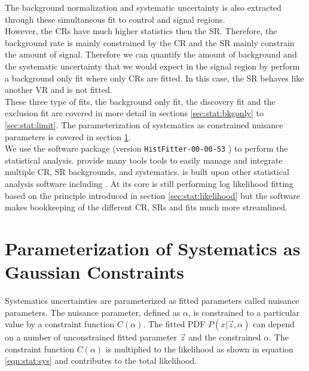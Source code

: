 \indent The background normalization and systematic uncertainty is also extracted through these simultaneous fit to control and signal regions. \\

\indent However, the CRs have much higher statistics then the SR.  Therefore, the background rate is mainly constrained by the CR and the SR mainly constrain the amount of signal.  Therefore we can quantify the amount of background and the systematic uncertainty that we would expect in the signal region by perform a background only fit where only CRs are fitted.  In this case, the SR behaves like another VR and is not fitted.  \\

\indent These three type of fits, the background only fit, the discovery fit and the exclusion fit are covered in more detail in sections \ref{sec:stat:bkgonly} to \ref{sec:stat:limit}. The parameterization of systematics as constrained nuisance parameters is covered in section \ref{sec:stat:sys}. \\

\indent We use the software package \HistFitter (version {\tt HistFitter-00-00-53} ) to perform the statistical analysis.\cite{HistFitter}  \HistFitter provide many tools tools to easily manage and integrate multiple CR, SR backgrounds, and systematics.  \HistFitter is built upon other statistical analysis software including \RooFit.\cite{RooFit} At its core \HistFitter is still performing log likelihood fitting based on the principle introduced in section \ref{sec:stat:likelihood} but the software makes bookkeeping of the different CR, SRs and fits much more streamlined. \\

\section{Parameterization of Systematics as Gaussian Constraints}
\label{sec:stat:sys}

\indent Systematics uncertainties are parameterized as fitted parameters called nuisance parameters.  The nuisance parameter, defined as $\alpha$, is constrained to a particular value by a constraint function $C(\alpha)$.   The fitted PDF $P(x|\vec{z},\alpha)$ can depend on a number of unconstrained fitted parameter $\vec{z}$ and the constrained $\alpha$.  The constraint function $C(\alpha)$ is multiplied to the likelihood as shown in equation \ref{eqn:stat:sys} and contributes to the total likelihood.  

